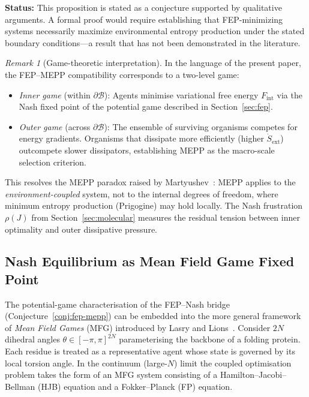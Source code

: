 \documentclass[12pt,a4paper]{article}
\theoremstyle{remark}
\newtheorem{remark}{Remark}
\begin{document}
\noindent\textbf{Status:} This proposition is stated as a conjecture supported by qualitative arguments. A formal proof would require establishing that FEP-minimizing systems necessarily maximize environmental entropy production under the stated boundary conditions---a result that has not been demonstrated in the literature.

\begin{remark}[Game-theoretic interpretation]
In the language of the present paper, the FEP--MEPP compatibility
corresponds to a two-level game:
\begin{itemize}
  \item \emph{Inner game} (within $\partial\mathcal{B}$): Agents
    minimise variational free energy $F_{\mathrm{int}}$ via the
    Nash fixed point of the potential game described in
    Section~\ref{sec:fep}.
  \item \emph{Outer game} (across $\partial\mathcal{B}$):
    The ensemble of surviving organisms competes for energy
    gradients. Organisms that dissipate more efficiently
    (higher $\dot{S}_{\mathrm{ext}}$) outcompete slower
    dissipators, establishing MEPP as the macro-scale selection
    criterion.
\end{itemize}
This resolves the MEPP paradox raised by
Martyushev~\cite{Martyushev2010}: MEPP applies to the
\emph{environment-coupled} system, not to the internal degrees
of freedom, where minimum entropy production (Prigogine) may
hold locally. The Nash frustration $\rho(J)$ from
Section~\ref{sec:molecular} measures the residual tension
between inner optimality and outer dissipative pressure.
\end{remark}

\subsection{Nash Equilibrium as Mean Field Game Fixed Point}\label{sec:mfg-fixpoint}

The potential-game characterisation of the FEP--Nash bridge (Conjecture~\ref{conj:fep-mepp}) can be embedded into the more general framework of \emph{Mean Field Games} (MFG) introduced by Lasry and Lions~\cite{LasryLions2007}. Consider $2N$ dihedral angles $\theta\in[-\pi,\pi]^{2N}$ parameterising the backbone of a folding protein. Each residue is treated as a representative agent whose state is governed by its local torsion angle. In the continuum (large-$N$) limit the coupled optimisation problem takes the form of an MFG system consisting of a Hamilton--Jacobi--Bellman (HJB) equation and a Fokker--Planck (FP) equation.
\end{document}
